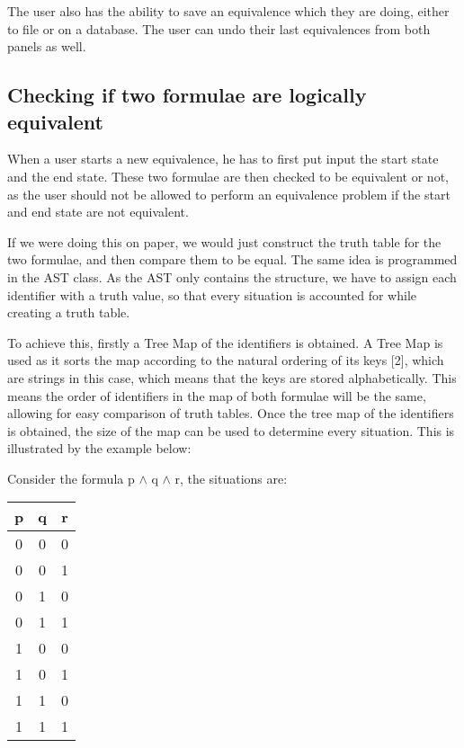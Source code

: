 \documentclass{report}
\begin{document}
The user also has the ability to save an equivalence which they are doing, either
to file or on a database. The user can undo their last equivalences from both panels
as well.


\subsection{Checking if two formulae are logically equivalent}

When a user starts a new equivalence, he has to first put input the start
state and the end state. These two formulae are then checked to be equivalent
or not, as the user should not be allowed to perform an equivalence problem
if the start and end state are not equivalent.

If we were doing this on paper, we would just construct the truth table for
the two formulae, and then compare them to be equal. The same idea is programmed
in the AST class. As the AST only contains the structure, we have to assign each
identifier with a truth value, so that every situation is accounted for while
creating a truth table.

To achieve this, firstly a Tree Map of the identifiers is obtained. A Tree Map is
used as it sorts the map according to the natural ordering of its keys [2], which are
strings in this case, which means that the keys are stored alphabetically. This means
the order of identifiers in the map of both formulae will be the same, allowing for
easy comparison of truth tables. Once the tree map of the identifiers is obtained,
the size of the map can be used to determine every situation. This is illustrated
by the example below:

Consider the formula p $\land$ q $\land$ r, the situations are:

\begin{center}
  \begin{tabular}{| c | c | c |}
    \hline
    p & q & r\\ \hline
    0 & 0 & 0 \\
    0 & 0 & 1 \\
		0 & 1 & 0 \\
		0 & 1 & 1 \\
		1 & 0 & 0 \\
		1 & 0 & 1 \\
    1 & 1 & 0 \\
    1 & 1 & 1 \\ \hline
  \end{tabular}
\end{center}
\end{document}
